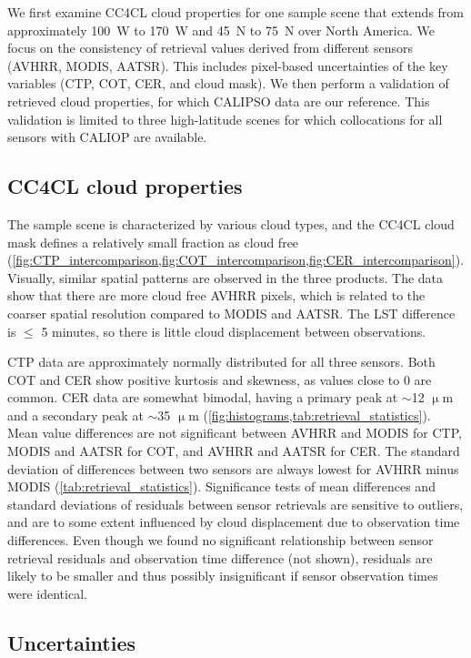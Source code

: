 We first examine CC4CL cloud properties for one sample scene that extends from approximately 100\textdegree\ W to 170\textdegree\ W and 45\textdegree\ N to 75\textdegree\ N over North America. We focus on the consistency of retrieval values derived from different sensors (AVHRR, MODIS, AATSR). This includes pixel-based uncertainties of the key variables (CTP, COT, CER, and cloud mask). We then perform a validation of retrieved cloud properties, for which CALIPSO data are our reference. This validation is limited to three high-latitude scenes for which collocations for all sensors with CALIOP are available.

\subsection{CC4CL cloud properties}

The sample scene is characterized by various cloud types, and the CC4CL cloud mask defines a relatively small fraction as cloud free (\cref{fig:CTP_intercomparison,fig:COT_intercomparison,fig:CER_intercomparison}). Visually, similar spatial patterns are observed in the three products. The data show that there are more cloud free AVHRR pixels, which is related to the coarser spatial resolution compared to MODIS and AATSR. The LST difference is $\le$ 5 minutes, so there is little cloud displacement between observations.

CTP data are approximately normally distributed for all three sensors. Both COT and CER show positive kurtosis and skewness, as values close to 0 are common. CER data are somewhat bimodal, having a primary peak at $\sim$12 $\upmu$m and a secondary peak at $\sim$35 $\upmu$m (\cref{fig:histograms,tab:retrieval_statistics}). Mean value differences are not significant between AVHRR and MODIS for CTP, MODIS and AATSR for COT, and AVHRR and AATSR for CER. The standard deviation of differences between two sensors are always lowest for AVHRR minus MODIS (\cref{tab:retrieval_statistics}). Significance tests of mean differences and standard deviations of residuals between sensor retrievals are sensitive to outliers, and are to some extent influenced by cloud displacement due to observation time differences. Even though we found no significant relationship between sensor retrieval residuals and observation time difference (not shown), residuals are likely to be smaller and thus possibly insignificant if sensor observation times were identical.

\subsection{Uncertainties}

